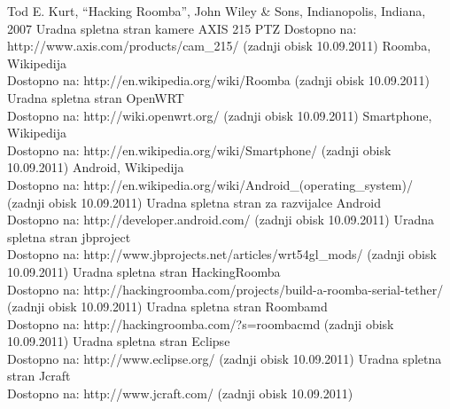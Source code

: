 \documentclass[a4paper, 12pt]{book}
\begin{document}
\begin{thebibliography}{99}
 Tod E. Kurt, ``Hacking Roomba'', John Wiley \& Sons,  Indianopolis, Indiana,  2007
 Uradna spletna stran kamere AXIS 215 PTZ
Dostopno na: http://www.axis.com/products/cam\_215/ (zadnji obisk 10.09.2011)
Roomba, Wikipedija \\
Dostopno na: http://en.wikipedia.org/wiki/Roomba (zadnji obisk 10.09.2011)
 Uradna spletna stran OpenWRT \\
Dostopno na: http://wiki.openwrt.org/ (zadnji obisk 10.09.2011)
 Smartphone, Wikipedija \\
Dostopno na: http://en.wikipedia.org/wiki/Smartphone/ (zadnji obisk 10.09.2011)
 Android, Wikipedija \\
Dostopno na: http://en.wikipedia.org/wiki/Android\_(operating\_system)/ (zadnji obisk 10.09.2011)
 Uradna spletna stran za razvijalce Android \\
Dostopno na: http://developer.android.com/ (zadnji obisk 10.09.2011)
 Uradna spletna stran jbproject \\
Dostopno na: http://www.jbprojects.net/articles/wrt54gl\_mods/ (zadnji obisk 10.09.2011)
 Uradna spletna stran HackingRoomba \\
Dostopno na: http://hackingroomba.com/projects/build-a-roomba-serial-tether/ (zadnji obisk 10.09.2011)
 Uradna spletna stran Roombamd \\
Dostopno na: http://hackingroomba.com/?s=roombacmd (zadnji obisk 10.09.2011)
 Uradna spletna stran Eclipse \\
Dostopno na: http://www.eclipse.org/ (zadnji obisk 10.09.2011)
 Uradna spletna stran Jcraft \\
Dostopno na: http://www.jcraft.com/ (zadnji obisk 10.09.2011)
\end{thebibliography}
\end{document}
